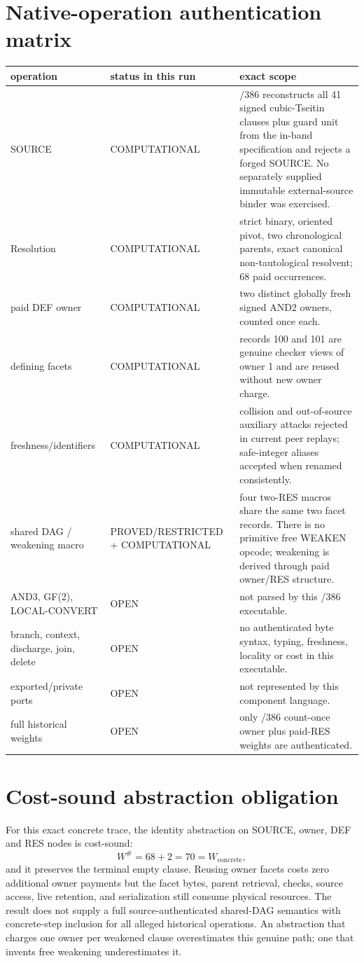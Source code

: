 \documentclass[11pt]{article}
\begin{document}
\section{Native-operation authentication matrix}
\begin{longtable}{p{.19\linewidth}p{.20\linewidth}p{.52\linewidth}}
\toprule
operation & status in this run & exact scope\\
\midrule
SOURCE & COMPUTATIONAL & /386 reconstructs all 41 signed cubic-Tseitin clauses
plus guard unit from the in-band specification and rejects a forged SOURCE.
No separately supplied immutable external-source binder was exercised.\\
Resolution & COMPUTATIONAL & strict binary, oriented pivot, two chronological
parents, exact canonical non-tautological resolvent; 68 paid occurrences.\\
paid DEF owner & COMPUTATIONAL & two distinct globally fresh signed AND2
owners, counted once each.\\
defining facets & COMPUTATIONAL & records 100 and 101 are genuine checker
views of owner 1 and are reused without new owner charge.\\
freshness/identifiers & COMPUTATIONAL & collision and out-of-source auxiliary
attacks rejected in current peer replays; safe-integer aliases accepted when
renamed consistently.\\
shared DAG / weakening macro & PROVED/RESTRICTED + COMPUTATIONAL & four
two-RES macros share the same two facet records.  There is no primitive free
WEAKEN opcode; weakening is derived through paid owner/RES structure.\\
AND3, GF(2), LOCAL-CONVERT & OPEN & not parsed by this /386 executable.\\
branch, context, discharge, join, delete & OPEN & no authenticated byte syntax,
typing, freshness, locality or cost in this executable.\\
exported/private ports & OPEN & not represented by this component language.\\
full historical weights & OPEN & only /386 count-once owner plus paid-RES
weights are authenticated.\\
\bottomrule
\end{longtable}

\section{Cost-sound abstraction obligation}
For this exact concrete trace, the identity abstraction on SOURCE, owner, DEF
and RES nodes is cost-sound:
\[
W^{\#}=68+2=70=W_{\mathrm{concrete}},
\]
and it preserves the terminal empty clause.  Reusing owner facets costs zero
additional owner payments but the facet bytes, parent retrieval, checks,
source access, live retention, and serialization still consume physical
resources.  The result does not supply a full source-authenticated shared-DAG
semantics with concrete-step inclusion for all alleged historical operations.
An abstraction that charges one owner per weakened clause overestimates this
genuine path; one that invents free weakening underestimates it.
\end{document}
